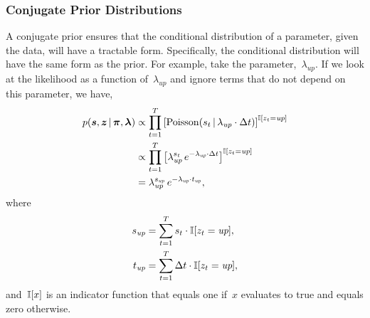 \subsubsection{Conjugate Prior Distributions}
A conjugate prior ensures that the conditional distribution of a
parameter, given the data, will have a tractable form.  Specifically,
the conditional distribution will have the same form as the prior.
For example, take the parameter,~$\lambda_{\textit{up}}$. If we look
at the likelihood as a function of~$\lambda_{\textit{up}}$ and ignore
terms that do not depend on this parameter, we have,
\begin{align*}
  p(\boldsymbol{s}, \boldsymbol{z} \,|\, \boldsymbol{\pi}, \boldsymbol{\lambda})
  &\propto \prod_{t=1}^T \left[
    \mathrm{Poisson}(s_t \,|\, \lambda_{\textit{up}} \cdot \Delta t)
    \right]^{\mathbb{I}[z_t = \textit{up}]} \\
  &\propto \prod_{t=1}^T \left[
    \lambda_{\textit{up}}^{s_t} \,
    e^{-\lambda_{\textit{up}} \cdot \Delta t}
    \right]^{\mathbb{I}[z_t = \textit{up}]} \\
  &=
  \lambda_{\textit{up}}^{s_{\textit{up}}} \,
  e^{-\lambda_{\textit{up}} \cdot t_{\textit{up}}},
\end{align*}
where
\begin{align*}
  s_{\textit{up}} &= \sum_{t=1}^T s_t \cdot \mathbb{I}[z_t = \textit{up}], \\
  t_{\textit{up}} &= \sum_{t=1}^T \Delta t \cdot \mathbb{I}[z_t = \textit{up}],
\end{align*}
and~$\mathbb{I}[x]$ is an indicator function that equals one if~$x$ evaluates to true
and equals zero otherwise.

